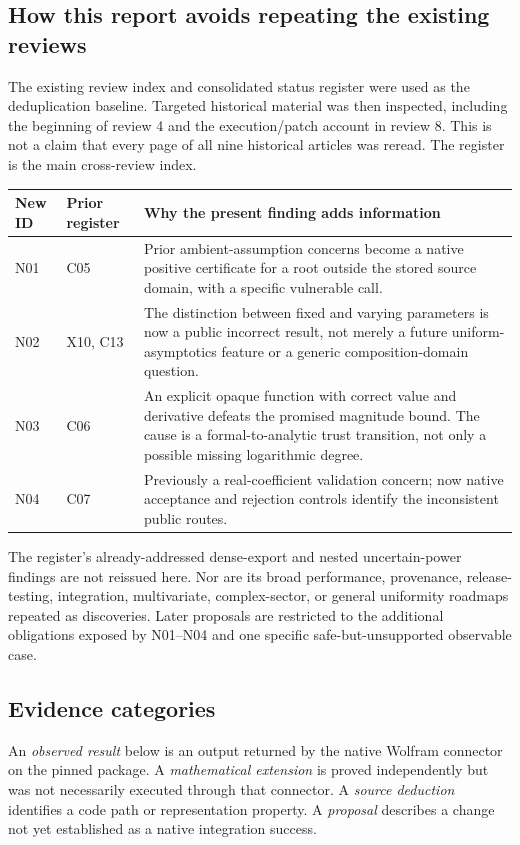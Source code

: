\documentclass[11pt,letterpaper]{article}
\newcommand{\code}[1]{\texttt{\detokenize{#1}}}
\begin{document}
\subsection{How this report avoids repeating the existing reviews}
The existing review index and consolidated status register were used as the deduplication baseline. Targeted historical material was then inspected, including the beginning of review 4 and the execution/patch account in review 8. This is not a claim that every page of all nine historical articles was reread. The register is the main cross-review index.\cite{reviewindex,status,review4,review8}

\begin{longtable}{@{}P{0.10\textwidth}P{0.17\textwidth}P{0.66\textwidth}@{}}
\toprule New ID & Prior register & Why the present finding adds information\\
\midrule\endhead
N01 & C05 & Prior ambient-assumption concerns become a native positive certificate for a root outside the stored source domain, with a specific vulnerable \code{Refine} call.\\
N02 & X10, C13 & The distinction between fixed and varying parameters is now a public incorrect result, not merely a future uniform-asymptotics feature or a generic composition-domain question.\\
N03 & C06 & An explicit opaque function with correct value and derivative defeats the promised magnitude bound. The cause is a formal-to-analytic trust transition, not only a possible missing logarithmic degree.\\
N04 & C07 & Previously a real-coefficient validation concern; now native acceptance and rejection controls identify the inconsistent public routes.\\
\bottomrule
\end{longtable}

The register's already-addressed dense-export and nested uncertain-power findings are not reissued here. Nor are its broad performance, provenance, release-testing, integration, multivariate, complex-sector, or general uniformity roadmaps repeated as discoveries. Later proposals are restricted to the additional obligations exposed by N01--N04 and one specific safe-but-unsupported observable case.\cite{status}

\subsection{Evidence categories}
An \emph{observed result} below is an output returned by the native Wolfram connector on the pinned package. A \emph{mathematical extension} is proved independently but was not necessarily executed through that connector. A \emph{source deduction} identifies a code path or representation property. A \emph{proposal} describes a change not yet established as a native integration success.
\end{document}

